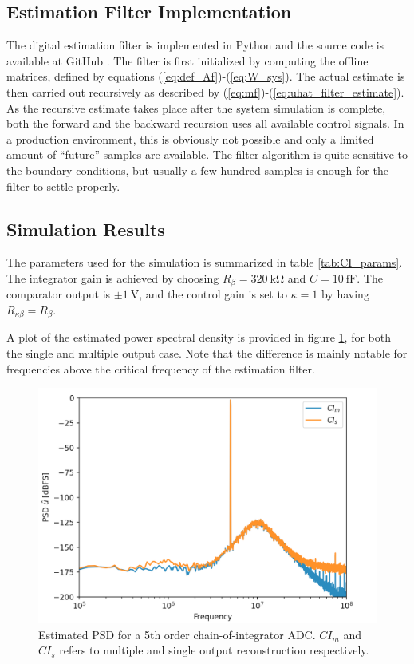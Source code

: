 \subsection{Estimation Filter Implementation}
The digital estimation filter is implemented in Python and the source code is available at GitHub \cite{cbadcsim2}. The filter is first initialized by computing the offline matrices, defined by equations (\ref{eq:def_Af})-(\ref{eq:W_sys}). The actual estimate is then carried out recursively as described by (\ref{eq:mf})-(\ref{eq:uhat_filter_estimate}). As the recursive estimate takes place after the system simulation is complete, both the forward and the backward recursion uses all available control signals. In a production environment, this is obviously not possible and only a limited amount of \enquote{future} samples are available. The filter algorithm is quite sensitive to the boundary conditions, but usually a few hundred samples is enough for the filter to settle properly.

\subsection{Simulation Results}
The parameters used for the simulation is summarized in table \ref{tab:CI_params}. The integrator gain is achieved by choosing $R_{\beta} = \SI{320}{\kilo\ohm}$ and $C = \SI{10}{\femto\farad}$. The comparator output is $\pm \SI{1}{\volt}$, and the control gain is set to $\kappa=1$ by having $R_{\kappa\beta} = R_\beta$.


A plot of the estimated power spectral density is provided in figure \ref{fig:CI_sim_N5}, for both the single and multiple output case. Note that the difference is mainly notable for frequencies above the critical frequency of the estimation filter.
\begin{figure}
    \centering
    \includegraphics[width=\linewidth]{figures/051chain/CI_SIM_N5.png}
    \caption{Estimated PSD for a 5th order chain-of-integrator ADC. $CI_m$ and $CI_s$ refers to multiple and single output reconstruction respectively.}
    \label{fig:CI_sim_N5}
\end{figure}

